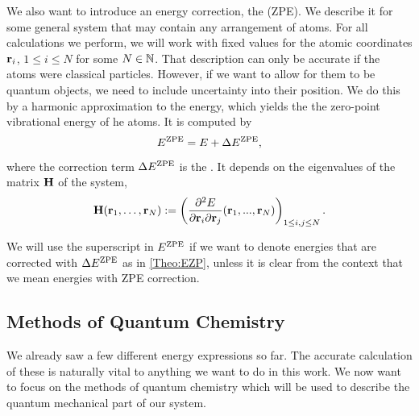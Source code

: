 We also want to introduce an energy correction, the  (ZPE).
We describe it for some general system that may contain any arrangement of atoms.
For all calculations we perform, we will work with fixed values for the atomic
coordinates $\mathbf{r}_i$, $1 \le i \le N$ for some $N \in \mathbb{N}$. That description can only be accurate if
the atoms were classical particles. However, if we want to allow for them to be
quantum objects, we need to include uncertainty into their position. We do
this by a harmonic approximation to the energy, which yields the
the zero-point vibrational energy of he atoms. It is computed by
\begin{equation}
 E^{\text{ZPE}}=E + \Delta E^{\text{ZPE}},
 \label{Theo:EZP}
\end{equation}
where the correction term $\Delta E^{\text{ZPE}}$ is the . It depends on the eigenvalues of the  matrix $\mathbf{H}$ of
the system,
\begin{equation}
 \mathbf{H}(\mathbf{r}_1,\ldots,\mathbf{r}_N) := \left({\frac {\partial{^2 E}} {\partial{\ensuremath{\mathbf{r}}_i \partial\ensuremath{\mathbf{r}}_j}} (\mathbf{r}_1,...,\mathbf{r}_N)
 }\right)_{1\le i,j \le N}.
 \label{Theo:Hessian}
\end{equation}

We will use the superscript in $E^{\text{ZPE}}$ if we want to denote energies that are corrected 
with $\Delta E^{\text{ZPE}}$ as in \eqref{Theo:EZP}, unless it is clear from the
context that we mean energies with ZPE correction.

\subsection{Methods of Quantum Chemistry}
\label{Sec:Theo:QMMet}

We already saw a few different energy expressions so far. The accurate
calculation of these is naturally vital to anything we want to do in this work.
We now want to focus on the methods of quantum chemistry which will be used to
describe the quantum mechanical part of our system.

